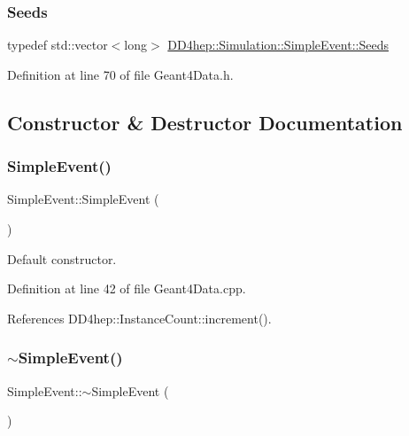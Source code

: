 \subsubsection{\texorpdfstring{Seeds}{Seeds}}
{\footnotesize\ttfamily typedef std\+::vector$<$long$>$ \hyperlink{class_d_d4hep_1_1_simulation_1_1_simple_event_a0a0e9b422036edb384b60a6f492eb8d4}{D\+D4hep\+::\+Simulation\+::\+Simple\+Event\+::\+Seeds}}



Definition at line 70 of file Geant4\+Data.\+h.



\subsection{Constructor \& Destructor Documentation}
\hypertarget{class_d_d4hep_1_1_simulation_1_1_simple_event_a93eec2da5659fe2a6b03bda7362b0940}{}\label{class_d_d4hep_1_1_simulation_1_1_simple_event_a93eec2da5659fe2a6b03bda7362b0940} 
\subsubsection{\texorpdfstring{Simple\+Event()}{SimpleEvent()}}
{\footnotesize\ttfamily Simple\+Event\+::\+Simple\+Event (\begin{DoxyParamCaption}{ }\end{DoxyParamCaption})}



Default constructor. 



Definition at line 42 of file Geant4\+Data.\+cpp.



References D\+D4hep\+::\+Instance\+Count\+::increment().

\hypertarget{class_d_d4hep_1_1_simulation_1_1_simple_event_a77e577dd4deef5466765196cc798c3b9}{}\label{class_d_d4hep_1_1_simulation_1_1_simple_event_a77e577dd4deef5466765196cc798c3b9} 
\subsubsection{\texorpdfstring{$\sim$\+Simple\+Event()}{~SimpleEvent()}}
{\footnotesize\ttfamily Simple\+Event\+::$\sim$\+Simple\+Event (\begin{DoxyParamCaption}{ }\end{DoxyParamCaption})\hspace{0.3cm}{\ttfamily [virtual]}}



